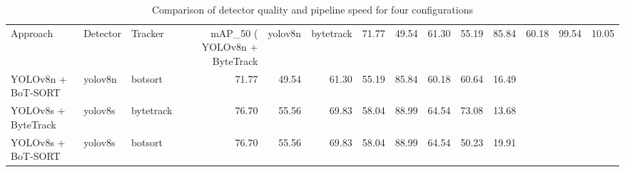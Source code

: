 \begin{table}
\caption{Comparison of detector quality and pipeline speed for four configurations}
\label{tab:models_comparison_test}
\begin{tabular}{lllrrrrrrrr}
\toprule
Approach & Detector & Tracker & mAP_50 (%
\midrule
YOLOv8n + ByteTrack & yolov8n & bytetrack & 71.77 & 49.54 & 61.30 & 55.19 & 85.84 & 60.18 & 99.54 & 10.05 \\
YOLOv8n + BoT-SORT & yolov8n & botsort & 71.77 & 49.54 & 61.30 & 55.19 & 85.84 & 60.18 & 60.64 & 16.49 \\
YOLOv8s + ByteTrack & yolov8s & bytetrack & 76.70 & 55.56 & 69.83 & 58.04 & 88.99 & 64.54 & 73.08 & 13.68 \\
YOLOv8s + BoT-SORT & yolov8s & botsort & 76.70 & 55.56 & 69.83 & 58.04 & 88.99 & 64.54 & 50.23 & 19.91 \\
\bottomrule
\end{tabular}
\end{table}

